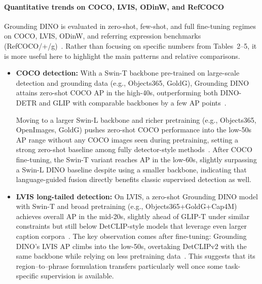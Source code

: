 \begin{enrichment}
\begin{enrichment}
	\end{enrichment}
	
	\newpage
	
	\begin{enrichment}
		\label{enr:chapter14_groundingdino_experiments}
		
		\paragraph{Quantitative trends on COCO, LVIS, ODinW, and RefCOCO}
		
		Grounding DINO is evaluated in zero-shot, few-shot, and full fine-tuning regimes on COCO, LVIS, ODinW, and referring expression benchmarks (RefCOCO/+/g)~\cite{liu2023_groundingdino}. Rather than focusing on specific numbers from Tables~2--5, it is more useful here to highlight the main patterns and relative comparisons.
		
		\begin{itemize}
			\item \textbf{COCO detection:} With a Swin-T backbone pre-trained on large-scale detection and grounding data (e.g., Objects365, GoldG), Grounding DINO attains zero-shot COCO AP in the high-40s, outperforming both DINO-DETR and GLIP with comparable backbones by a few AP points~\cite{zhang2022_dino,li2022_glip,liu2023_groundingdino}.
			
			Moving to a larger Swin-L backbone and richer pretraining (e.g., Objects365, OpenImages, GoldG) pushes zero-shot COCO performance into the low-50s AP range without any COCO images seen during pretraining, setting a strong zero-shot baseline among fully detector-style methods~\cite{liu2023_groundingdino}. After COCO fine-tuning, the Swin-T variant reaches AP in the low-60s, slightly surpassing a Swin-L DINO baseline despite using a smaller backbone, indicating that language-guided fusion directly benefits classic supervised detection as well.
			
			\item \textbf{LVIS long-tailed detection:} On LVIS, a zero-shot Grounding DINO model with Swin-T and broad pretraining (e.g., Objects365+GoldG+Cap4M) achieves overall AP in the mid-20s, slightly ahead of GLIP-T under similar constraints but still below DetCLIP-style models that leverage even larger caption corpora~\cite{gupta2019_lvis,li2022_glip,yao2023_detclipv2,liu2023_groundingdino}. The key observation comes after fine-tuning: Grounding DINO’s LVIS AP climbs into the low-50s, overtaking DetCLIPv2 with the same backbone while relying on less pretraining data~\cite{liu2023_groundingdino}. This suggests that its region–to–phrase formulation transfers particularly well once some task-specific supervision is available.
			

\end{itemize}
\end{enrichment}
\end{enrichment}
